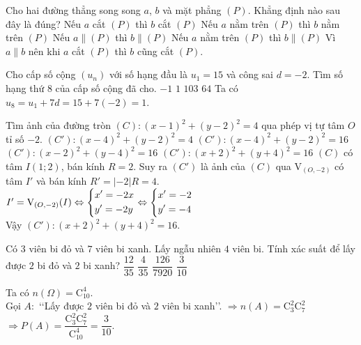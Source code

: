 \begin{ex}%
 Cho hai đường thẳng song song $a$, $b$ và mặt phẳng $(P)$. Khẳng định nào sau đây là đúng?
 \choice
  {\True Nếu $a$ cắt $(P)$ thì $b$ cắt $(P)$}
  {Nếu $a$ nằm trên $(P)$ thì $b$ nằm trên $(P)$}
  {Nếu $a\parallel (P)$ thì $b \parallel (P)$}
  {Nếu $a$ nằm trên $(P)$ thì $b\parallel(P)$}
 \loigiai
 {Vì $a \parallel b$ nên khi $a$ cắt $(P)$ thì $b$ cũng cắt $(P)$.
 }
\end{ex}

\begin{ex}%
 Cho cấp số cộng $\left( u_n \right)$ với số hạng đầu là $u_1=15$ và công sai $d=-2$. Tìm số hạng thứ $8$ của cấp số cộng đã cho.
 \choice
  {$-1$}
  {\True $1$}
  {$103$}
  {$64$}
 \loigiai
 {Ta có $u_8=u_1+7d=15+7(-2)=1$.
 }
\end{ex}

\begin{ex}%
 Tìm ảnh của đường tròn $(C):\left(x-1\right)^2+\left(y-2\right)^2=4$ qua phép vị tự tâm $O$ tỉ số $-2$.
 \choice
  {$(C'):\left(x-4\right)^2+\left(y-2\right)^2=4$}
  {$(C'):\left(x-4\right)^2+\left(y-2\right)^2=16$}
  {$(C'):\left(x-2\right)^2+\left(y-4\right)^2=16$}
  {\True $(C'):\left(x+2\right)^2+\left(y+4\right)^2=16$}
 \loigiai
 {$(C)$ có tâm $I(1;2)$, bán kính $R=2$. Suy ra $(C')$ là ảnh của $(C)$ qua $\mathrm{V}_{\left(O,-2\right)}$ có tâm $I'$ và bán kính $R'=\vert{-2}\vert R=4$.\\
 $I'=\mathrm{V}_{\left(O,-2\right)}(I) \Leftrightarrow \left\{\begin{aligned}&x'=-2x \\ &y'=-2y\end{aligned}\right. \Leftrightarrow \left\{\begin{aligned}&x'=-2 \\ &y'=-4\end{aligned}\right.$\\
 Vậy $(C'): \left(x+2\right)^2+\left(y+4\right)^2=16$.
 }
\end{ex}


\begin{ex}%
 Có $3$ viên bi đỏ và $7$ viên bi xanh. Lấy ngẫu nhiên $4$ viên bi. Tính xác suất để lấy được $2$ bi đỏ và $2$ bi xanh?
 \choice
  {$\dfrac{12}{35}$}
  {$\dfrac{4}{35}$}
  {$\dfrac{126}{7920}$}
  {\True $\dfrac{3}{10}$}
 \loigiai
 {Ta có $n(\Omega)=\mathrm{C}_{10}^4$.\\ Gọi $A:$ \lq\lq Lấy được $2$ viên bi đỏ và $2$ viên bi xanh\rq\rq . $\Rightarrow n(A)=\mathrm{C}_3^2 \mathrm{C}_7^2$\\
 $\Rightarrow P(A)=\dfrac{\mathrm{C}_3^2 \mathrm{C}_7^2}{\mathrm{C}_{10}^4}=\dfrac{3}{10}$.
 
 }
\end{ex}


